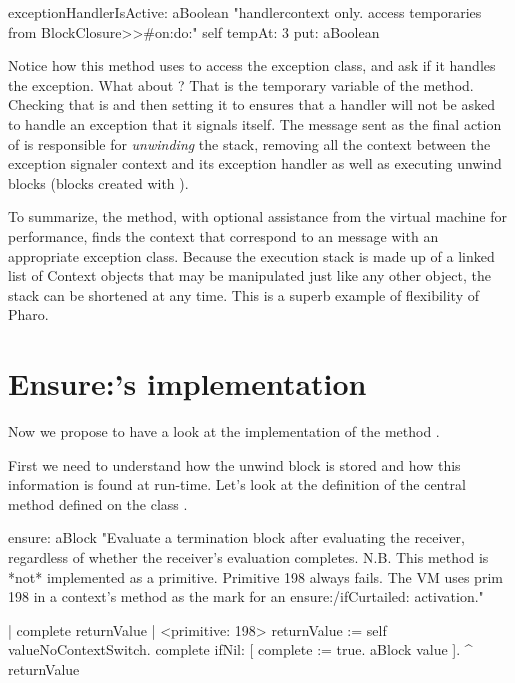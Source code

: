 \begin{code}{}
exceptionHandlerIsActive: aBoolean
	"handlercontext only. access temporaries from BlockClosure>>#on:do:"
	self tempAt: 3 put: aBoolean
\end{code}

Notice how this method uses  to access the exception class, and ask if it handles the exception.  What about  ?  That is the temporary variable  of the  method.   Checking that  is  and then setting it to  ensures that a handler will not be asked to handle an exception that it signals itself. 
The  message sent as the final action of  is responsible for \emph{unwinding} the stack, \ie removing all the context between the exception signaler context and its exception handler as well as executing unwind blocks (blocks created with ).


To summarize, the  method, with optional assistance from the virtual machine for performance, finds the context that correspond to an  message with an appropriate exception class.   Because the execution stack is made up of a linked list of Context objects that may be manipulated just like any other object, the stack can be shortened at any time. This is a superb example of flexibility of Pharo.

\section{Ensure:'s implementation}
Now we propose to have a look at the implementation of the method . 

First we need to understand how the unwind block is stored and how this information is found at run-time. Let's look at the definition of the central method  defined on the class . 

\begin{code}{}
ensure: aBlock
	"Evaluate a termination block after evaluating the receiver, regardless of
	 whether the receiver's evaluation completes.  N.B.  This method is *not*
	 implemented as a primitive.  Primitive 198 always fails.  The VM uses prim
	 198 in a context's method as the mark for an ensure:/ifCurtailed: activation."

	| complete returnValue |
	<primitive: 198>
	returnValue := self valueNoContextSwitch.
	complete ifNil: [
		complete := true.
		aBlock value ].
	^ returnValue
\end{code}

